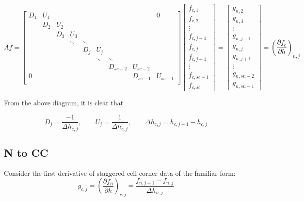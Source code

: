 \documentclass[11pt]{article}
\begin{document}
\[
Af =
\left[
\begin{array}{ccccccccc}
D_{1} & U_{1} &  &   &   &   &   &   & 0 \\
  & D_{2} & U_{2} &   &   &   &   &   &   \\
  &   & D_{3} & U_{3} &   &   &   &   &   \\
  &   &  & \ddots & \ddots &   &   &   &   \\
  &   &   &   & D_{j} & U_{j} &   &   &   \\
  &   &   &   &  & \ddots & \ddots &   &   \\
  &   &   &   &   &   & D_{sc-2} & U_{sc-2} &   \\
 0 &   &   &   &   &   &   & D_{sc-1} & U_{sc-1} \\
\end{array}
\right]
\left[ \begin{array}{c}
f_{c,1} \\ f_{c,2} \\ \vdots \\ f_{c,j-1} \\ f_{c,j} \\ f_{c,j+1} \\ \vdots \\ f_{c,sc-1} \\ f_{c,sc}
\end{array} \right]
=
\left[ \begin{array}{c}
g_{n,2} \\ g_{n,3} \\ \vdots \\ g_{n,j-1} \\ g_{n,j} \\ g_{n,j+1} \\ \vdots \\ g_{n,sn-2} \\ g_{n,sn-1}
\end{array} \right]
 = \left( \frac{\partial f_{c}}{\partial h} \right)_{n,j}
\]

From the above diagram, it is clear that

\begin{equation}
  D_j = \frac{-1}{\Delta h_{c,j}}, \qquad
  U_j = \frac{1}{\Delta h_{c,j}}, \qquad
  \Delta h_{c,j} = h_{c,j+1}-h_{c,j}
\end{equation}

\subsection{N to CC}
Consider the first derivative of staggered cell corner data of the familiar form:
\begin{equation}
  g_{c,j} = \left( \frac{\partial f_{n}}{\partial h} \right)_{c,j} = \frac{f_{n,j+1}-f_{n,j}}{\Delta h_{n,j}}
\end{equation}
\end{document}

